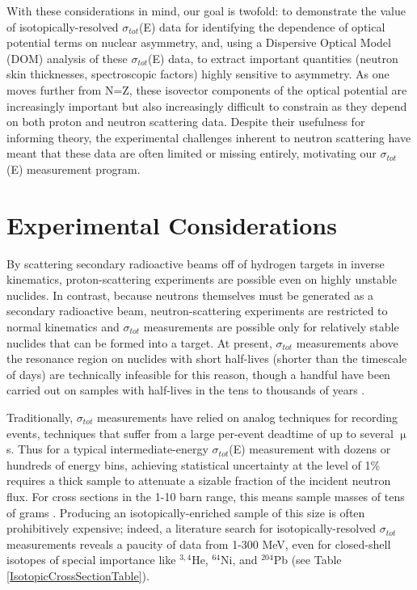 \documentclass[twocolumn,secnumarabic,amssymb, nobibnotes, aps, prl,
superscriptaddress, nobalancelastpage]{revtex4}
\newcommand{\tots}{\ensuremath{\sigma_{tot}}\,\,}
\newcommand{\totEs}{\ensuremath{\sigma_{tot}}(E)\,\,}
\begin{document}
With these considerations in mind, our goal is twofold: to demonstrate the
value of isotopically-resolved \totEs data for identifying the dependence of optical 
potential terms on nuclear asymmetry, and, using a Dispersive Optical Model
(DOM) analysis of these \totEs data, to extract important quantities (neutron skin
thicknesses, spectroscopic factors) highly sensitive to asymmetry.
As one moves further from N=Z, these isovector components of the optical potential
are increasingly important but also increasingly
difficult to constrain as they depend on both proton and neutron scattering
data. Despite their usefulness for informing theory, the experimental 
challenges inherent to neutron scattering have meant that these data are often 
limited or missing entirely, motivating our \totEs measurement program.


\section{Experimental Considerations}
By scattering secondary radioactive beams off of hydrogen targets in inverse
kinematics, proton-scattering experiments are possible even on highly unstable
nuclides. In contrast, because neutrons themselves must be generated as a
secondary radioactive beam, neutron-scattering experiments are restricted to
normal kinematics and \tots measurements are possible only for relatively stable
nuclides that can be formed into a target. At present, \tots measurements above
the resonance region on nuclides with short half-lives (shorter than the timescale of
days) are technically infeasible for this reason, though a handful have been carried out on
samples with half-lives in the tens to thousands of years \cite{Poenitz1983,
Phillips1980, Foster1971}.

Traditionally, \tots measurements have relied on analog techniques for recording
events, techniques that suffer from a large per-event deadtime of
up to several $\upmu$s. Thus for a typical intermediate-energy \totEs measurement
with dozens or hundreds of energy bins, achieving statistical uncertainty at the
level of 1\% requires a thick sample to attenuate a sizable fraction of the
incident neutron flux. For cross sections in the 1-10 barn range, this means
sample masses of tens of grams \cite{Finlay1993, Abfalterer2001}.
Producing an isotopically-enriched sample of this size is often
prohibitively expensive; indeed, a literature search for isotopically-resolved
\tots measurements reveals a paucity of data from 1-300 MeV, even for
closed-shell isotopes of special importance like $^{3,4}$He, $^{64}$Ni, and
$^{204}$Pb (see Table \ref{IsotopicCrossSectionTable}).
\end{document}
